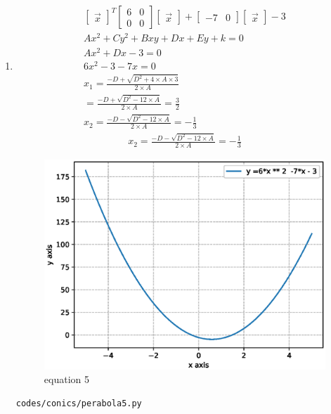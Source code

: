 \begin{enumerate}[label=\arabic*.,ref=\thesubsection.\theenumi]
\item
\begin{align}
\begin{bmatrix}\vec x\end{bmatrix}^T\begin{bmatrix}6 & 0\\0 & 0\end{bmatrix}\begin{bmatrix}\vec x\end{bmatrix} + \begin{bmatrix}-7 & 0\end{bmatrix}\begin{bmatrix}\vec x\end{bmatrix} -3
\\
Ax^2+Cy^2+Bxy+Dx+Ey+k =0
\\
Ax^2 + Dx- 3= 0
\\
6x^2-3-7x = 0
\\
x_1 =  \frac{-D + \sqrt{D^2 + 4\times A\times 3 }}{2\times A}
\\
=  \frac{-D + \sqrt{D^2 - 12\times A }}{2\times A} = \frac{3}{2}
\\
x_2 =\frac{-D - \sqrt{D^2 - 12\times A }}{2\times A} = -\frac{1}{3} 
\end{align}
\begin{align}
x_2 =\frac{-D - \sqrt{D^2 - 12\times A }}{2\times A} = -\frac{1}{3}
\end{align}
\begin{figure}[!ht]
	\centering
	\includegraphics[width=\columnwidth]{./figures/conics/perabola5.eps}
	\caption{equation 5 }
	\label{fig:perabola5}
\end{figure}
\begin{lstlisting}
codes/conics/perabola5.py
\end{lstlisting}


\end{enumerate}

